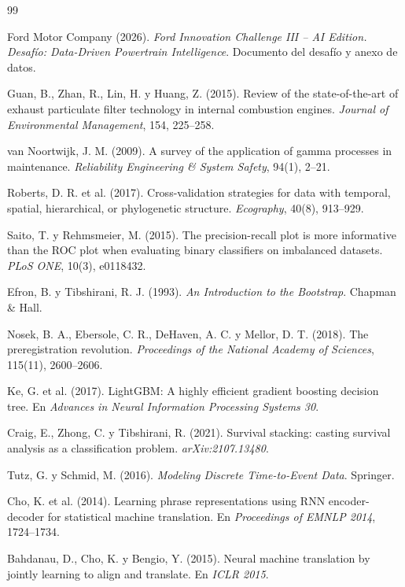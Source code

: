 \begin{thebibliography}{99}
\setlength{\itemsep}{2pt}

 Ford Motor Company (2026). \textit{Ford Innovation Challenge III -- AI Edition. Desafío: Data-Driven
  Powertrain Intelligence}. Documento del desafío y anexo de datos.

 Guan, B., Zhan, R., Lin, H. y Huang, Z. (2015). Review of the state-of-the-art of exhaust particulate
  filter technology in internal combustion engines. \textit{Journal of Environmental Management}, 154, 225--258.

 van Noortwijk, J. M. (2009). A survey of the application of gamma processes in maintenance.
  \textit{Reliability Engineering \& System Safety}, 94(1), 2--21.

 Roberts, D. R. et al. (2017). Cross-validation strategies for data with temporal, spatial,
  hierarchical, or phylogenetic structure. \textit{Ecography}, 40(8), 913--929.

 Saito, T. y Rehmsmeier, M. (2015). The precision-recall plot is more informative than the ROC plot when
  evaluating binary classifiers on imbalanced datasets. \textit{PLoS ONE}, 10(3), e0118432.

 Efron, B. y Tibshirani, R. J. (1993). \textit{An Introduction to the Bootstrap}. Chapman \& Hall.

 Nosek, B. A., Ebersole, C. R., DeHaven, A. C. y Mellor, D. T. (2018). The preregistration revolution.
  \textit{Proceedings of the National Academy of Sciences}, 115(11), 2600--2606.

 Ke, G. et al. (2017). LightGBM: A highly efficient gradient boosting decision tree. En \textit{Advances in
  Neural Information Processing Systems 30}.

 Craig, E., Zhong, C. y Tibshirani, R. (2021). Survival stacking: casting survival analysis as a
  classification problem. \textit{arXiv:2107.13480}.

 Tutz, G. y Schmid, M. (2016). \textit{Modeling Discrete Time-to-Event Data}. Springer.

 Cho, K. et al. (2014). Learning phrase representations using RNN encoder-decoder for statistical machine
  translation. En \textit{Proceedings of EMNLP 2014}, 1724--1734.

 Bahdanau, D., Cho, K. y Bengio, Y. (2015). Neural machine translation by jointly learning to align
  and translate. En \textit{ICLR 2015}.


\end{thebibliography}
